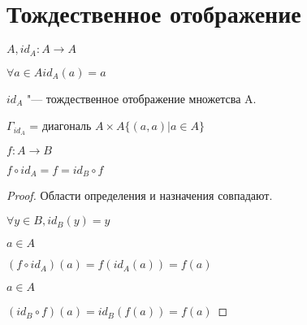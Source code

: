 ﻿\section{Тождественное отображение}

\begin{Def}
$A, id_{A}: A \to A$

$\forall a \in A id_A(a) = a$

$id_A$ "--- тождественное  отображение множетсва A.

$\Gamma_{id_A}$ = диагональ $A \times A \{(a, a)| a \in A\}$ 
\end{Def}

\begin{theorem}{}
$f: A \to B$

$f \circ id_A = f =  id_B \circ f$
\end{theorem}

\begin{proof}

Области определения и назначения совпадают. 

$\forall y \in B, id_{B}(y) = y$

$a \in A$

$(f \circ id_A)(a) = f(id_A(a)) = f(a)$

$a \in A$

$(id_B \circ f)(a) = id_B(f(a)) = f(a)$

\end{proof}